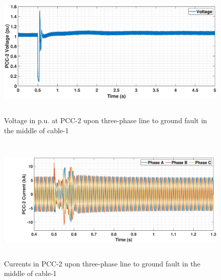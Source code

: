 \begin{figure}[H]
\captionsetup{justification=centering}
    \includegraphics[height = 6.5cm,width = \textwidth]{Diagrams/Chapter_5/VACP_WT2_3phaseSC.eps}
    \caption{Voltage in p.u. at PCC-2 upon three-phase line to ground fault in the middle of cable-1}
    \label{VACP_WT234_3phaseSC}
\end{figure}


\begin{figure}[H]
\captionsetup{justification=centering}
    \includegraphics[height = 6cm,width = \textwidth]{Diagrams/Chapter_5/IABC_WT2_3phaseSC.eps}
    \caption{Currents in PCC-2 upon three-phase line to ground fault in the middle of cable-1}
    \label{IABC_WT2_3phaseSC}
\end{figure}

